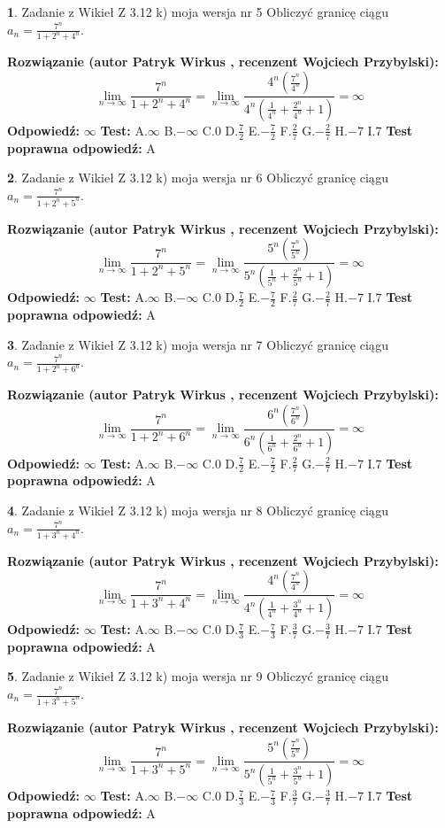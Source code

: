 \documentclass[12pt, a4paper]{article}
\theoremstyle{definition} %
\newtheorem{zad}{}
\newcommand{\zadStart}[1]{\begin{zad}#1\newline}
\newcommand{\zadStop}{\end{zad}}
\newcommand{\rozwStart}[2]{\noindent \textbf{Rozwiązanie (autor #1 , recenzent #2): }\newline}
\newcommand{\rozwStop}{\newline}
\newcommand{\odpStart}{\noindent \textbf{Odpowiedź:}\newline}
\newcommand{\odpStop}{\newline}
\newcommand{\testStart}{\noindent \textbf{Test:}\newline}
\newcommand{\testStop}{\newline}
\newcommand{\kluczStart}{\noindent \textbf{Test poprawna odpowiedź:}\newline}
\newcommand{\kluczStop}{\newline}
\begin{document}
\zadStart{Zadanie z Wikieł Z 3.12 k) moja wersja nr 5}
Obliczyć granicę ciągu $a_{n}=\frac{7^{n}}{1+2^{n} + 4^{n}}$.
\zadStop
\rozwStart{Patryk Wirkus}{Wojciech Przybylski}
$$\lim\limits_{n\to\infty}\frac{7^{n}}{1+2^{n} + 4^{n}}=
\lim\limits_{n\to\infty}\frac{4^{n}(\frac{7^{n}}{4^{n}} )}{4^{n}(\frac{1}{4^{n}}+\frac{2^{n}}{4^{n}}+1)} = \infty$$
\rozwStop
\odpStart
$\infty$
\odpStop
\testStart
A.$\infty$
B.$-\infty$
C.$0$
D.$\frac{7}{2}$
E.$-\frac{7}{2}$
F.$\frac{2}{7}$
G.$-\frac{2}{7}$
H.$-7$
I.$7$
\testStop
\kluczStart
A
\kluczStop



\zadStart{Zadanie z Wikieł Z 3.12 k) moja wersja nr 6}
Obliczyć granicę ciągu $a_{n}=\frac{7^{n}}{1+2^{n} + 5^{n}}$.
\zadStop
\rozwStart{Patryk Wirkus}{Wojciech Przybylski}
$$\lim\limits_{n\to\infty}\frac{7^{n}}{1+2^{n} + 5^{n}}=
\lim\limits_{n\to\infty}\frac{5^{n}(\frac{7^{n}}{5^{n}} )}{5^{n}(\frac{1}{5^{n}}+\frac{2^{n}}{5^{n}}+1)} = \infty$$
\rozwStop
\odpStart
$\infty$
\odpStop
\testStart
A.$\infty$
B.$-\infty$
C.$0$
D.$\frac{7}{2}$
E.$-\frac{7}{2}$
F.$\frac{2}{7}$
G.$-\frac{2}{7}$
H.$-7$
I.$7$
\testStop
\kluczStart
A
\kluczStop



\zadStart{Zadanie z Wikieł Z 3.12 k) moja wersja nr 7}
Obliczyć granicę ciągu $a_{n}=\frac{7^{n}}{1+2^{n} + 6^{n}}$.
\zadStop
\rozwStart{Patryk Wirkus}{Wojciech Przybylski}
$$\lim\limits_{n\to\infty}\frac{7^{n}}{1+2^{n} + 6^{n}}=
\lim\limits_{n\to\infty}\frac{6^{n}(\frac{7^{n}}{6^{n}} )}{6^{n}(\frac{1}{6^{n}}+\frac{2^{n}}{6^{n}}+1)} = \infty$$
\rozwStop
\odpStart
$\infty$
\odpStop
\testStart
A.$\infty$
B.$-\infty$
C.$0$
D.$\frac{7}{2}$
E.$-\frac{7}{2}$
F.$\frac{2}{7}$
G.$-\frac{2}{7}$
H.$-7$
I.$7$
\testStop
\kluczStart
A
\kluczStop



\zadStart{Zadanie z Wikieł Z 3.12 k) moja wersja nr 8}
Obliczyć granicę ciągu $a_{n}=\frac{7^{n}}{1+3^{n} + 4^{n}}$.
\zadStop
\rozwStart{Patryk Wirkus}{Wojciech Przybylski}
$$\lim\limits_{n\to\infty}\frac{7^{n}}{1+3^{n} + 4^{n}}=
\lim\limits_{n\to\infty}\frac{4^{n}(\frac{7^{n}}{4^{n}} )}{4^{n}(\frac{1}{4^{n}}+\frac{3^{n}}{4^{n}}+1)} = \infty$$
\rozwStop
\odpStart
$\infty$
\odpStop
\testStart
A.$\infty$
B.$-\infty$
C.$0$
D.$\frac{7}{3}$
E.$-\frac{7}{3}$
F.$\frac{3}{7}$
G.$-\frac{3}{7}$
H.$-7$
I.$7$
\testStop
\kluczStart
A
\kluczStop



\zadStart{Zadanie z Wikieł Z 3.12 k) moja wersja nr 9}
Obliczyć granicę ciągu $a_{n}=\frac{7^{n}}{1+3^{n} + 5^{n}}$.
\zadStop
\rozwStart{Patryk Wirkus}{Wojciech Przybylski}
$$\lim\limits_{n\to\infty}\frac{7^{n}}{1+3^{n} + 5^{n}}=
\lim\limits_{n\to\infty}\frac{5^{n}(\frac{7^{n}}{5^{n}} )}{5^{n}(\frac{1}{5^{n}}+\frac{3^{n}}{5^{n}}+1)} = \infty$$
\rozwStop
\odpStart
$\infty$
\odpStop
\testStart
A.$\infty$
B.$-\infty$
C.$0$
D.$\frac{7}{3}$
E.$-\frac{7}{3}$
F.$\frac{3}{7}$
G.$-\frac{3}{7}$
H.$-7$
I.$7$
\testStop
\kluczStart
A
\kluczStop
\end{document}
